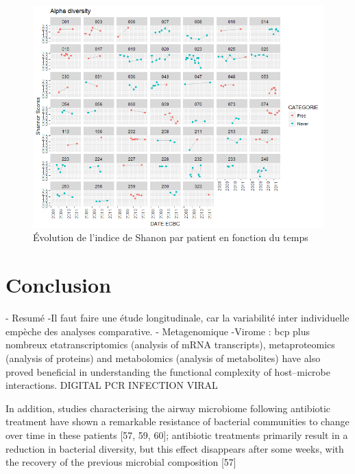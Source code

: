 \documentclass[12pt,a4paper]{article}
\begin{document}
\begin{figure}
\begin{center}
\includegraphics[scale=0.80]{img/alpha_shannon.png}\hfill
\end{center}
\caption{Évolution de l'indice de Shanon par patient en fonction du temps}
\label{alphaShannon}
\end{figure}


\section{Conclusion}
- Resumé
-Il faut faire une étude longitudinale, car la variabilité inter individuelle empèche des analyses comparative.
- Metagenomique
-Virome  : bcp plus nombreux
etatranscriptomics (analysis of mRNA transcripts), metaproteomics (analysis of proteins) and metabolomics (analysis of metabolites) have also proved beneficial in understanding the functional complexity of host–microbe interactions.
DIGITAL PCR
INFECTION VIRAL

In addition, studies characterising the airway microbiome following antibiotic treatment have shown a
remarkable resistance of bacterial communities to change over time in these patients [57, 59, 60];
antibiotic treatments primarily result in a reduction in bacterial diversity, but this effect disappears after
some weeks, with the recovery of the previous microbial composition [57]

\newpage




\end{document}
